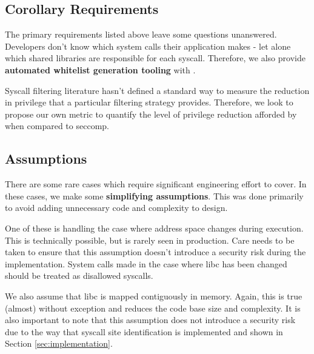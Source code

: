 \subsection{Corollary Requirements} \label{subsubsec:corollary-reqs}

The primary requirements listed above leave some questions unanswered.
Developers don't know which system calls their application makes - let alone
which shared libraries are responsible for each syscall. Therefore, we also
provide \textbf{automated whitelist generation tooling} with \af. 

Syscall filtering literature hasn't defined a standard way to measure the
reduction in privilege that a particular filtering strategy provides. Therefore,
we look to propose our own metric to quantify the level of privilege reduction
afforded by \af when compared to seccomp.

\subsection{Assumptions}\label{subsec:assumptions}

There are some rare cases which require significant engineering effort to cover.
In these cases, we make some \textbf{simplifying assumptions}. This was done
primarily to avoid adding unnecessary code and complexity to \afg design. 
 
One of these is handling the case where  address space changes during
execution. This is technically possible, but is rarely seen in production.
Care needs to be taken to ensure that this assumption doesn't introduce a
security risk during the implementation. System calls made in the case where 
\ac{libc} has been changed should be treated as disallowed syscalls.


We also assume that \ac{libc} is mapped contiguously in memory. Again, this is
true (almost) without exception and reduces the code base size and complexity.
It is also important to note that this assumption does not introduce a security
risk due to the way that syscall site identification is implemented and shown in
Section \ref{sec:implementation}. 

